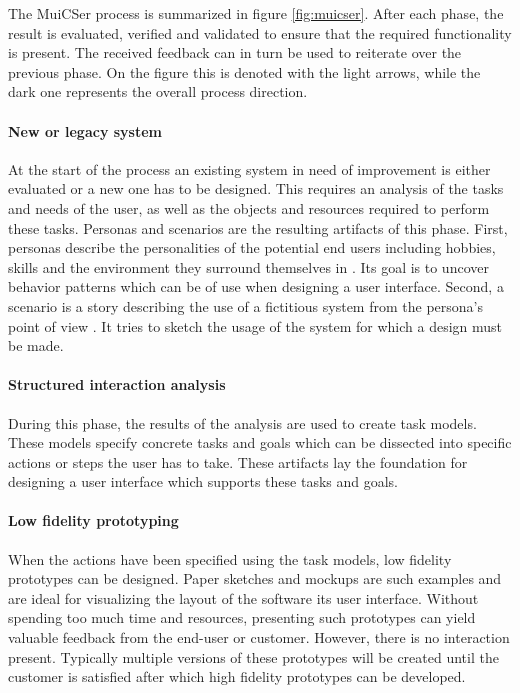         The MuiCSer process is summarized in figure \ref{fig:muicser}. After each phase, the result is evaluated, verified and validated to ensure that the required functionality is present. The received feedback can in turn be used to reiterate over the previous phase. On the figure this is denoted with the light arrows, while the dark one represents the overall process direction.

        \paragraph{New or legacy system} At the start of the process an existing system in need of improvement is either evaluated or a new one has to be designed. This requires an analysis of the tasks and needs of the user, as well as the objects and resources required to perform these tasks. Personas and scenarios are the resulting artifacts of this phase. First, personas describe the personalities of the potential end users including hobbies, skills and the environment they surround themselves in \cite{persona_scenario}. Its goal is to uncover behavior patterns which can be of use when designing a user interface. Second, a scenario is a story describing the use of a fictitious system from the persona's point of view \cite{persona_scenario}. It tries to sketch the usage of the system for which a design must be made.

        \paragraph{Structured interaction analysis} During this phase, the results of the analysis are used to create task models. These models specify concrete tasks and goals which can be dissected into specific actions or steps the user has to take. These artifacts lay the foundation for designing a user interface which supports these tasks and goals.

        \paragraph{Low fidelity prototyping} When the actions have been specified using the task models, low fidelity prototypes can be designed. Paper sketches and mockups are such examples and are ideal for visualizing the layout of the software its user interface. Without spending too much time and resources, presenting such prototypes can yield valuable feedback from the end-user or customer. However, there is no interaction present. Typically multiple versions of these prototypes will be created until the customer is satisfied after which high fidelity prototypes can be developed.

